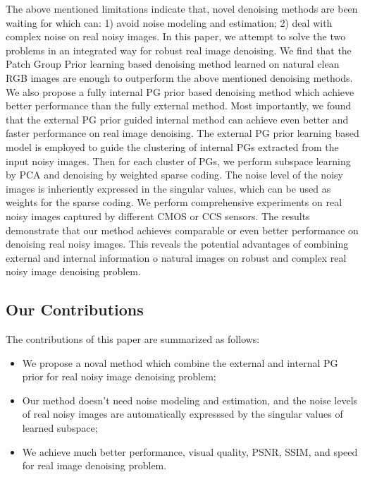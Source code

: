 \documentclass[10pt,twocolumn,letterpaper]{article}
\begin{document}
The above mentioned limitations indicate that, novel denoising methods are been waiting for which can: 1) avoid noise modeling and estimation; 2) deal with complex noise on real noisy images. In this paper, we attempt to solve the two problems in an integrated way for robust real image denoising. We find that the Patch Group Prior learning based denoising \cite{PGPD} method learned on natural clean RGB images are enough to outperform the above mentioned denoising methods. We also propose a fully internal PG prior based denoising method which achieve better performance than the fully external method. Most importantly, we found that the external PG prior guided internal method can achieve even better and faster performance on real image denoising. The external PG prior learning based model is employed to guide the clustering of internal PGs extracted from the input noisy images. Then for each cluster of PGs, we perform subspace learning by PCA and denoising by weighted sparse coding. The noise level of the noisy images is inheriently expressed in the singular values, which can be used as weights for the sparse coding. We perform comprehensive experiments on real noisy images captured by different CMOS or CCS sensors. The results demonstrate that our method achieves comparable or even better performance on denoising real noisy images. This reveals the potential advantages of combining external and internal information o natural images on robust and complex real noisy image denoising problem.


\subsection{Our Contributions}
The contributions of this paper are summarized as follows:
\begin{itemize}
\item We propose a noval method which combine the external and internal PG prior for real noisy image denoising problem;
\item Our method doesn't need noise modeling and estimation, and the noise levels of real noisy images are automatically expresssed by the singular values of learned subspace;
\item We achieve much better performance, visual quality, PSNR, SSIM, and speed for real image denoising problem.

\end{itemize}
\end{document}
